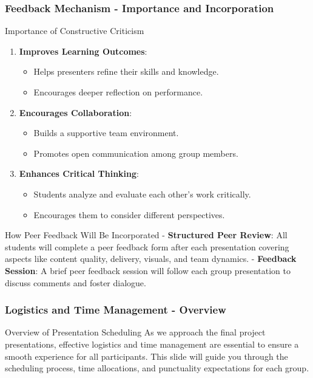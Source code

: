 \documentclass[aspectratio=169]{beamer}
\begin{document}
\begin{frame}[fragile]
    \frametitle{Feedback Mechanism - Importance and Incorporation}
    \begin{block}{Importance of Constructive Criticism}
        \begin{enumerate}
            \item \textbf{Improves Learning Outcomes}:
                \begin{itemize}
                    \item Helps presenters refine their skills and knowledge.
                    \item Encourages deeper reflection on performance.
                \end{itemize}
            \item \textbf{Encourages Collaboration}:
                \begin{itemize}
                    \item Builds a supportive team environment.
                    \item Promotes open communication among group members.
                \end{itemize}
            \item \textbf{Enhances Critical Thinking}:
                \begin{itemize}
                    \item Students analyze and evaluate each other's work critically.
                    \item Encourages them to consider different perspectives.
                \end{itemize}
        \end{enumerate}
    \end{block}
    
    \begin{block}{How Peer Feedback Will Be Incorporated}
        - \textbf{Structured Peer Review}: All students will complete a peer feedback form after each presentation covering aspects like content quality, delivery, visuals, and team dynamics.
        - \textbf{Feedback Session}: A brief peer feedback session will follow each group presentation to discuss comments and foster dialogue.
    \end{block}
\end{frame}

\begin{frame}[fragile]
    \frametitle{Logistics and Time Management - Overview}
    \begin{block}{Overview of Presentation Scheduling}
        As we approach the final project presentations, effective logistics and time management are essential to ensure a smooth experience for all participants. This slide will guide you through the scheduling process, time allocations, and punctuality expectations for each group.
    \end{block}
\end{frame}
\end{document}
